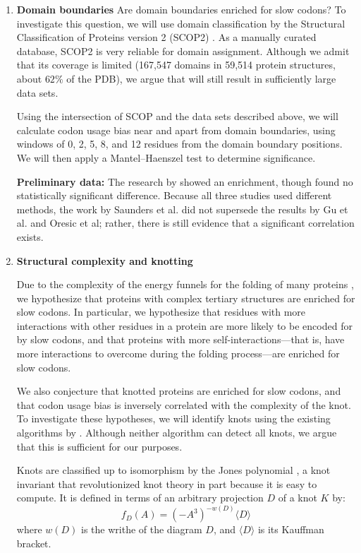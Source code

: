 \documentclass[11pt]{nih}
\begin{document}
\begin{enumerate}
\item \textbf{Domain boundaries}
Are domain boundaries enriched for slow codons?
To investigate this question, we will use domain classification by the Structural Classification of Proteins version 2 (SCOP2) \citep{Andreeva2013,scop}. As a manually curated database, SCOP2 is very reliable for domain assignment. Although we admit that its coverage is limited (167,547 domains in 59,514 protein structures, about $62\%$ of the PDB), we argue that will still result in sufficiently large data sets.

Using the intersection of SCOP and the data sets described above, we will calculate codon usage bias near and apart from domain boundaries, using windows of 0, 2, 5, 8, and 12 residues from the domain boundary positions. We will then apply a Mantel--Haenszel test to determine significance.

\textbf{Preliminary data:} The research by \citet{Gu2004,Oresic2003} showed an enrichment, though \citet{Saunders2010} found no statistically significant difference. Because all three studies used different methods, the work by Saunders et al. did not supersede the results by Gu et al. and Oresic et al; rather, there is still evidence that a significant correlation exists.

\item \textbf{Structural complexity and knotting}

Due to the complexity of the energy funnels for the folding of many proteins \citep{bryngelson1995funnels,Onuchic2004}, we hypothesize that proteins with complex tertiary structures are enriched for slow codons. In particular, we hypothesize that residues with more interactions with other residues in a protein are more likely to be encoded for by slow codons, and that proteins with more self-interactions---that is, have more interactions to overcome during the folding process---are enriched for slow codons.

We also conjecture that knotted proteins are enriched for slow codons, and that codon usage bias is inversely correlated with the complexity of the knot. To investigate these hypotheses, we will identify knots using the existing algorithms by \citet{Lai2012,Virnau2006}. Although neither algorithm can detect all knots, we argue that this is sufficient for our purposes.

Knots are classified up to isomorphism by the Jones polynomial \cite{Jones2005}, a knot invariant that revolutionized knot theory in part because it is easy to compute. It is defined in terms of an arbitrary projection $D$ of a knot $K$ by:\\
\begin{equation}
f_D(A) = (-A^3)^{-w(D)}\langle D \rangle
\end{equation}
where $w(D)$ is the writhe of the diagram $D$, and $\langle D\rangle$ is its Kauffman bracket.


\end{enumerate}
\end{document}
